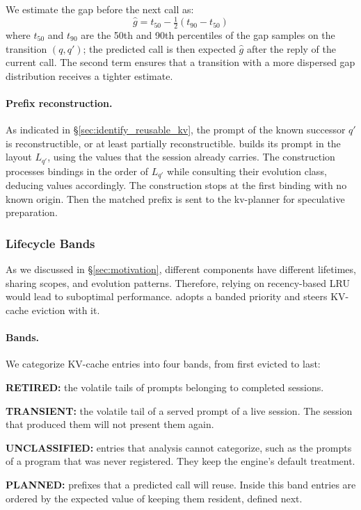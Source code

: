 We estimate the gap before the next call as:
\[
\hat{g}= t_{50}-\tfrac{1}{2}(t_{90}-t_{50})
\]
where $t_{50}$ and $t_{90}$ are the 50th and 90th percentiles of the gap samples on the transition $(q,q')$; the predicted call is then expected $\hat{g}$ after the reply of the current call. The second term ensures that a transition with a more dispersed gap distribution receives a tighter estimate. 

\paragraph{Prefix reconstruction.}
As indicated in \S\ref{sec:identify_reusable_kv}, the prompt of the known successor $q'$ is reconstructible, or at least partially reconstructible. \sysname builds its prompt in the layout $L_{q'}$, using the values that the session already carries. The construction processes bindings in the order of $L_{q'}$ while consulting their evolution class, deducing values accordingly. The construction stops at the first binding with no known origin. Then the matched prefix is sent to the kv-planner for speculative preparation. 

\subsubsection{Lifecycle Bands}
As we discussed in \S\ref{sec:motivation}, different components have different lifetimes, sharing scopes, and evolution patterns. Therefore, relying on recency-based LRU would lead to suboptimal performance. \sysname adopts a banded priority and steers KV-cache eviction with it. 

\paragraph{Bands.}
We categorize KV-cache entries into four bands, from first evicted to last:
\begin{enumerate*}[label=(\arabic*)]
    \item \textbf{RETIRED:} the volatile tails of prompts belonging to completed sessions. 
    \item \textbf{TRANSIENT:} the volatile tail of a served prompt of a live session. The session that produced them will not present them again.
    \item \textbf{UNCLASSIFIED:} entries that analysis cannot categorize, such as the prompts of a program that was never registered. They keep the engine's default treatment.
    \item \textbf{PLANNED:} prefixes that a predicted call will reuse. Inside this band entries are ordered by the expected value of keeping them resident, defined next.
\end{enumerate*}

